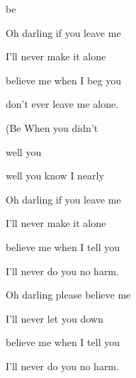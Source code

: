 

\zs
{}  

  

be  

     
\ks

\zs
Oh darling if you leave me 

I'll never make it alone 

believe me when I beg you 

don't ever leave me alone.  
\ks

\zr
(Be  When you  didn't  

well you  

   

well you know I nearly   
\kr

\zs
Oh darling if you leave me 

I'll never make it alone 

believe me when I tell you 

I'll never do you no harm. 
\ks

\zr
\kr 

\zs
Oh darling please believe me 

I'll never let you down 

believe me when I tell you 

I'll never do you no harm.    
\ks

\kp





